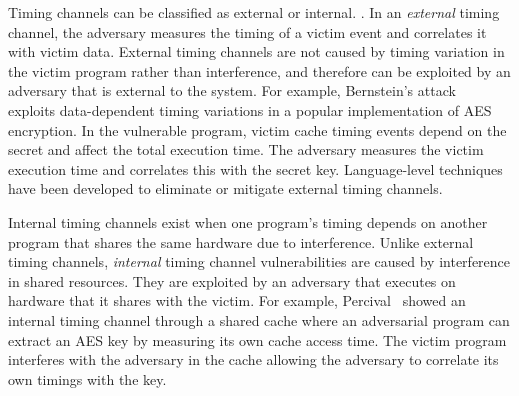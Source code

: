 Timing channels can be classified as external or internal.
\cite{mitigation3}.  In an {\em external} timing channel, the adversary measures 
the timing of a victim event and correlates it with victim data.  External 
timing channels are not caused by timing variation in the victim program rather 
than interference, and therefore can be exploited by an adversary that is 
external to the system.
For example, Bernstein's attack~\cite{bernstein} exploits data-dependent
timing variations in a popular implementation of AES encryption.  In the 
vulnerable program, victim cache timing events depend on the secret and affect 
the total execution time. The adversary measures the victim execution time and 
correlates this with the secret key.
Language-level techniques have been developed to
eliminate \cite{timesens} or mitigate \cite{mitigation1,mitigation2,mitigation3} 
external timing channels.


Internal timing channels exist when one program's timing depends on another
program that shares the same hardware due to interference. Unlike external 
timing channels, {\em internal} timing channel vulnerabilities are caused by 
interference in shared resources.
They are exploited by an adversary that executes on hardware that it shares with 
the victim.
For example, Percival~\cite{percival} showed an internal timing channel
through a shared cache where an adversarial program can extract an AES key
by measuring its own cache access time. The victim program interferes with the 
adversary in the cache allowing the adversary to correlate its own timings with 
the key.

